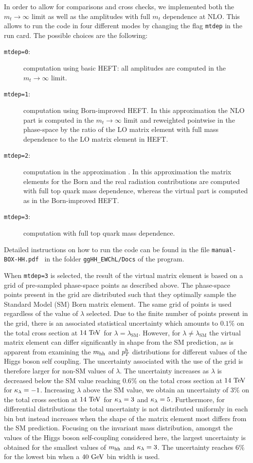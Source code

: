 In order to allow for comparisons and cross checks, we implemented
both the $m_t\to\infty$ limit as well as the  amplitudes with full $m_t$ dependence at
NLO. This allows to run the code in four different modes by changing
the flag {\tt mtdep} in the \powhegbox{} run card. The possible
choices are the following:
\begin{description}
 \item[{\tt mtdep=0}:]{computation using basic HEFT: all amplitudes
   are computed in the $m_t\to\infty$ limit.}
\item[{\tt mtdep=1}:]{computation using Born-improved HEFT. In this
   approximation the NLO part is computed in the $m_t\to\infty$ limit
   and reweighted pointwise in the phase-space by the ratio of the LO matrix
   element with full mass dependence to  the LO matrix
   element in HEFT.}
 \item[{\tt mtdep=2}:]{computation in the approximation \ftapprox. In
   this approximation the matrix elements for the Born and the real
   radiation contributions are computed with full top quark mass dependence, whereas the virtual part is
   computed as in the Born-improved HEFT. }
 \item[{\tt mtdep=3}:]{computation with full top quark mass dependence.}
\end{description}
Detailed instructions on how to run the code can be found in the
file {\tt manual-BOX-HH.pdf } in the folder {\tt ggHH\_EWChL/Docs} of the program.

When {\tt mtdep=3} is selected, the result of the virtual matrix element is based on a grid of pre-sampled phase-space points as described above. The phase-space points present in the grid are distributed such that they optimally sample the Standard Model (SM) Born matrix element. The same grid of points is used regardless of the value of $\lambda$ selected. Due to the finite number of points present in the grid, there is an associated statistical uncertainty which amounts to $0.1\%$ on the total cross section at $14\ \TeV$ for $\lambda=\lambda_\mathrm{SM}$. However, for $\lambda \neq \lambda_\mathrm{SM}$ the virtual matrix element can differ significantly in shape from the SM prediction, as is apparent from examining the $m_{\mathrm{hh}}$ and $p_T^{\mathrm{h}}$ distributions for different values of the Higgs boson self coupling. The uncertainty associated with the use of the grid is therefore larger for non-SM values of $\lambda$. The uncertainty increases as $\lambda$ is decreased below the SM value reaching $0.6\%$ on the total cross section at $14\ \TeV$ for $\kappa_{\lambda} = -1$. Increasing $\lambda$ above the SM value, we obtain an uncertainty of $3\%$ on the total cross section at $14\ \TeV$ for $\kappa_{\lambda} = 3$ and  $\kappa_{\lambda} = 5$. Furthermore, for differential distributions the total uncertainty is not distributed uniformly in each bin but instead increases when the shape of the matrix element most differs from the SM prediction. Focusing on the invariant mass distribution, amongst the values of the Higgs boson self-coupling considered here, the largest uncertainty is obtained for the smallest values of $m_{\mathrm{hh}}$ and $\kappa_{\lambda}=3$. The uncertainty reaches $6\%$ for the lowest bin when a $40\ \mathrm{GeV}$ bin width is used.
